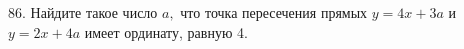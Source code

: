 86. Найдите такое число $a,$ что точка пересечения прямых $y=4x+3a$ и $y=2x+4a$ имеет ординату, равную 4.\\
